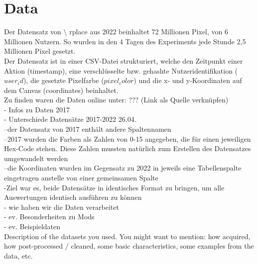 \section{Data} \label{data}  %

Der Datensatz von $\setminus$ rplace aus 2022 beinhaltet 72 Millionen Pixel, von 6 Millionen Nutzern. So wurden in den 4 Tagen des Experiments jede Stunde 2,5 Millionen Pixel gesetzt. \\
Der Datensatz ist in einer CSV-Datei strukturiert, welche den Zeitpunkt einer Aktion (timestamp), eine verschlüsselte bzw. gehashte Nutzeridentifikation ($user_id$), die gesetzte Pixelfarbe ($pixel_color$) und die x- und y-Koordinaten auf dem Canvas (coordinates) beinhaltet. \\
Zu finden waren die Daten online unter: ??? (Link als Quelle verknüpfen)\\
- Infos zu Daten 2017\\
- Unterschiede Datensätze 2017-2022 26.04.\\

--der Datensatz von 2017 enthält andere Spaltennamen \\
--2017 wurden die Farben als Zahlen von 0-15 angegeben, die für einen jeweiligen Hex-Code stehen. Diese Zahlen mussten natürlich zum Erstellen des Datensatzes umgewandelt werden \\
--die Koordinaten wurden im Gegensatz zu 2022 in jeweils eine Tabellenspalte eingetragen anstelle von einer gemeinsamen Spalte \\
-Ziel war es, beide Datensätze in identisches Format zu bringen, um alle Auswertungen identisch ausführen zu können\\

- wie haben wir die Daten verarbeitet\\
- ev. Besonderheiten zu Mods\\
- ev. Beispieldaten\\


Description of the datasets you used. You might want to mention: how acquired, how post-processed / cleaned, some basic characteristics, some examples from the data, etc.


